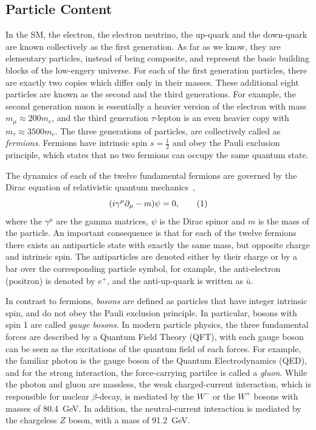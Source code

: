\subsection{Particle Content}
In the SM, the electron, the electron neutrino, the up-quark and the down-quark are known 
collectively as the first generation. As far as we know, they are elementary particles, 
instead of being composite, and represent the basic building blocks of the low-engery universe. 
For each of the first generation particles, there are exactly two copies which differ only 
in their masses. These additional eight particles are known as the second and the third generations. 
For example, the second generation muon is essentially a heavier version 
of the electron with mass $m_\mu \approx 200 m_e$,
and the third generation $\tau$-lepton is an even heavier copy with  $m_\tau \approx 3500 m_e$.
The three generations of particles, are collectively called as \textit{fermions}. 
Fermions have intrinsic spin $s = \frac{1}{2}$ and obey the Pauli exclusion principle, which 
states that no two fermions can occupy the same quantum state.

The dynamics of each of the twelve fundamental fermions are governed by the
Dirac equation of relativistic quantum mechanics~\cite{Dirac},
 \[ (i\gamma^\mu \partial_\mu -m)\psi = 0,
  \addtag \]
where the $\gamma^\mu$ are the gamma matrices, $\psi$ is the Dirac spinor and $m$ is the mass of the particle.
An important consequence is that
for each of the twelve fermions there exists an antiparticle state with exactly the same mass, but 
opposite charge and intrinsic spin. 
The antiparticles are denoted either by their charge or by a bar over the corresponding 
particle symbol, for example, the anti-electron (positron) is denoted by $e^+$, and the anti-up-quark
is written as $\bar{u}$.

In contrast to fermions, \textit{bosons} are defined as particles that have integer intrinsic spin, 
and do not obey the Pauli exclusion principle.
In particular, bosons with spin 1 are called \textit{gauge bosons}. 
In modern particle physics, the three fundamental forces are described by a Quantum Field Theory (QFT), 
with each gauge boson can be seen as the excitations of the quantum field of each forces. 
For example, the familiar photon is the gauge boson of the Quantum Electrodynamics (QED), 
and for the strong interaction, the force-carrying partilce is called a \textit{gluon}. 
While the photon and gluon are massless,  the weak charged-current interaction,
which is responsible for nuclear $\beta$-decay, is mediated by the $W^-$ or the $W^+$ bosons with masses of 80.4~GeV. 
In addition, the neutral-current interaction is mediated by the chargeless $Z$ boson, with a mass of 91.2~GeV. 


